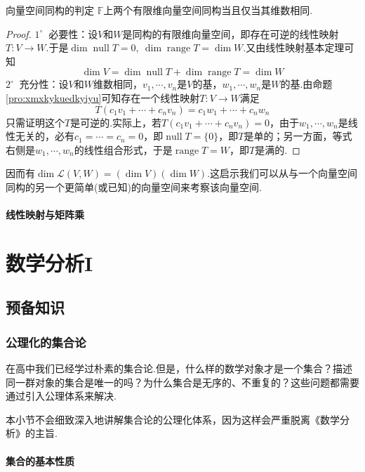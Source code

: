 \documentclass[lang=cn, zihao=5]{elegantbook}
\newcommand{\F}{\mathbb{F}}
\newcommand{\lmap}{\mathcal{L}}
\newcommand{\buzhou}[1]{$#1^{\circ} \ $}
\DeclareMathOperator{\nul}{null}
\DeclareMathOperator{\rge}{range}
\begin{document}
\begin{proposition}{向量空间同构的判定}
	$\F$上两个有限维向量空间同构当且仅当其维数相同.
\end{proposition}
\begin{proof}
	\buzhou{1} 必要性：设$V$和$W$是同构的有限维向量空间，即存在可逆的线性映射$T:V \to W$.于是$\dim \nul T = 0,~\dim \rge T =\dim W$.又由线性映射基本定理可知$$\dim V = \dim \nul T + \dim \rge T = \dim W$$
	\buzhou{2} 充分性：设$V$和$W$维数相同，$v_1, \cdots ,v_n$是$V$的基，$w_1, \cdots ,w_n$是$W$的基.由命题\ref{pro:xmxkykuedkyiyu}可知存在一个线性映射$T:V \to W$满足$$T(c_1v_1 + \cdots + c_nv_n)=c_1w_1 + \cdots + c_nw_n$$
	只需证明这个$T$是可逆的.实际上，若$T(c_1v_1 + \cdots + c_nv_n)=0$，由于$w_1, \cdots ,w_n$是线性无关的，必有$c_1= \cdots = c_n=0$，即$\nul T = \{ 0 \}$，即$T$是单的；另一方面，等式右侧是$w_1, \cdots ,w_n$的线性组合形式，于是$\rge T = W$，即$T$是满的.
\end{proof}

因而有$\dim \lmap (V,W)=(\dim V)(\dim W)$.这启示我们可以从与一个向量空间同构的另一个更简单(或已知)的向量空间来考察该向量空间.

\subsection{线性映射与矩阵乘}

\setcounter{chapter}{0}
\part{数学分析I}

\chapter{预备知识}

\section{公理化的集合论}

在高中我们已经学过朴素的集合论.但是，什么样的数学对象才是一个集合？描述同一群对象的集合是唯一的吗？为什么集合是无序的、不重复的？这些问题都需要通过引入公理体系来解决.

本小节不会细致深入地讲解集合论的公理化体系，因为这样会严重脱离《数学分析》的主旨.

\subsection{集合的基本性质}
\end{document}
